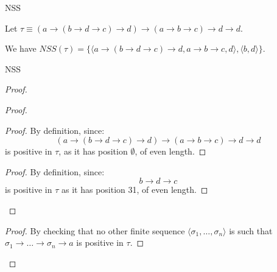 \begin{frame}{NSS}
\begin{exa}
\label{ex_nss}
Let $\tau \equiv (a \rightarrow (b \rightarrow d \rightarrow c) \rightarrow d)\rightarrow (a \rightarrow b \rightarrow c) \rightarrow d \rightarrow d$. 

We have $NSS(\tau) = \{ \langle a \rightarrow (b \rightarrow d \rightarrow c) \rightarrow d, a \rightarrow b \rightarrow c, d \rangle, \langle b, d \rangle \}$.
\end{exa}
\end{frame}

\begin{frame}{NSS}
\begin{proof}
\pf
{}
\begin{proof}

\begin{proof}
By definition, since:
\begin{equation*}
(a \rightarrow (b \rightarrow d \rightarrow c) \rightarrow d)\rightarrow (a \rightarrow b \rightarrow c) \rightarrow d \rightarrow d
\end{equation*}
is positive in $\tau$, as it has position $\emptyset$, of even length. 
\end{proof}

\medskip 

\begin{proof} 
By definition, since: 
\begin{equation*}
    b \rightarrow d \rightarrow c
\end{equation*}
is positive in $\tau$ as it has position 31, of even length. 
\end{proof} 

\end{proof}

\medskip

\begin{proof} 
By checking that no other finite sequence $\langle \sigma_1, \ldots, \sigma_n \rangle$ is such that $\sigma_1 \rightarrow \ldots \rightarrow \sigma_n \rightarrow a$ is positive in $\tau$.  
\end{proof}
\end{proof}
\end{frame}


